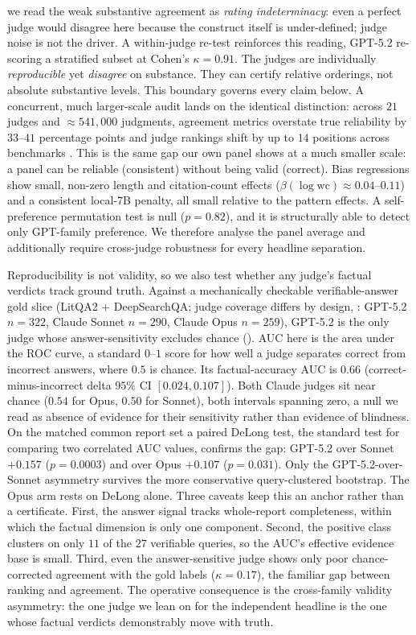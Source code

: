 \documentclass[11pt]{article}
\begin{document}
\citet{guerdan2025rating_indeterminacy} we read the weak substantive agreement as
\emph{rating indeterminacy}: even a perfect judge would disagree here because the
construct itself is under-defined; judge noise is not the driver. A within-judge re-test
reinforces this reading, GPT-5.2 re-scoring a stratified subset at Cohen's
$\kappa=0.91$. The judges are individually \emph{reproducible} yet \emph{disagree} on
substance. They can certify relative orderings, not absolute substantive levels. This
boundary governs every claim below. A concurrent, much larger-scale audit lands on
the identical distinction: across $21$ judges and $\approx\!541{,}000$ judgments,
agreement metrics overstate true reliability by $33$--$41$ percentage points and judge
rankings shift by up to $14$ positions across benchmarks \citep{norman2026reliability}.
This is the same gap our own panel shows at a much
smaller scale: a panel can be reliable (consistent) without being valid (correct). Bias regressions show small, non-zero length and citation-count effects
($\beta(\log\text{wc})\approx0.04$--$0.11$) and a consistent local-7B penalty, all small
relative to the pattern effects. A self-preference permutation test is null ($p=0.82$),
and it is structurally able to detect only GPT-family preference. We therefore analyse
the panel average and additionally require cross-judge robustness for every headline
separation.

Reproducibility is not validity, so we also test whether any judge's factual verdicts
track ground truth. Against a mechanically checkable verifiable-answer gold slice
(LitQA2 + DeepSearchQA; judge coverage differs by design, : GPT-5.2
$n{=}322$, Claude Sonnet $n{=}290$, Claude Opus $n{=}259$), GPT-5.2 is the only judge
whose answer-sensitivity excludes chance (). AUC here is the area under
the ROC curve, a standard $0$--$1$ score for how well a judge separates correct from
incorrect answers, where $0.5$ is chance. Its factual-accuracy AUC is $0.66$
(correct-minus-incorrect delta $95\%$ CI $[0.024,0.107]$). Both Claude
judges sit near chance ($0.54$ for Opus, $0.50$ for Sonnet), both intervals
spanning zero, a null we read as absence of evidence for their sensitivity rather than
evidence of blindness. On the matched common report set a paired DeLong test, the standard test for
comparing two correlated AUC values, confirms the gap: GPT-5.2 over Sonnet $+0.157$
($p{=}0.0003$) and over Opus $+0.107$ ($p{=}0.031$). Only
the GPT-5.2-over-Sonnet asymmetry survives the more conservative query-clustered
bootstrap. The Opus arm rests on DeLong alone. Three caveats keep this an anchor rather
than a certificate. First, the answer signal tracks whole-report
completeness, within which the factual dimension is only one component.
Second, the positive class clusters on
only $11$ of the $27$ verifiable queries, so the AUC's effective evidence base is small.
Third, even the answer-sensitive judge shows only poor chance-corrected agreement with
the gold labels ($\kappa=0.17$), the familiar gap between ranking and agreement. The
operative consequence is the cross-family validity asymmetry: the one judge we lean on
for the independent headline is the one whose factual verdicts demonstrably move with
truth.
\end{document}
